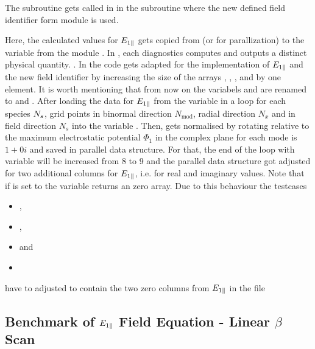 The subroutine  gets called in  in the subroutine  where the new defined field identifier  form module  is used. 

Here, the calculated values for $E_{1\parallel}$ gets copied from  (or  for parallization) to the variable  from the module . In \gkw, each diagnostics computes and outputs a distinct physical quantity. \cite{GKWManual}. In  the code gets adapted for the implementation of $E_{1\parallel}$ and the new field identifier  by increasing the size of the arrays , , ,  and  by one element. It is worth mentioning that from now on the variabels  and  are renamed to  and . After loading the data for $E_{1\parallel}$ from the variable  in a loop for each species $N_s$, grid points in binormal direction $N_\mathrm{mod}$, radial direction $N_x$ and in field direction $N_s$ into the variable . Then,  gets normalised by rotating relative to the maximum electrostatic potential $\Phi_1$ in the complex plane for each mode is $1 + 0i$ and saved in parallel data structure. For that, the end of the loop with variable  will be increased from 8 to 9 and the parallel data structure got adjusted for two additional columns for $E_{1\parallel}$, i.e. for real and imaginary values. Note that if  is set to  the variable  returns an zero array. Due to this behaviour the testcases 
\begin{itemize}
    \item {},
    \item {},
    \item {} and
    \item {}
\end{itemize}
have to adjusted to contain the two zero columns from $E_{1\parallel}$ in the file 

\subsection*{Benchmark of $E_{1\parallel}$ Field Equation - Linear $\beta$ Scan}
\label{sub:benchmarkFieldEpar}

